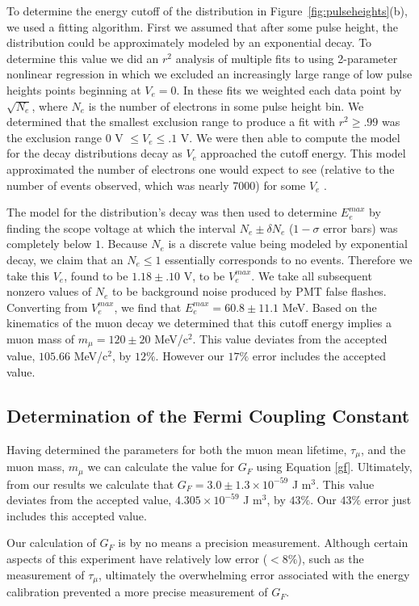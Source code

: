 To determine the energy cutoff of the distribution in Figure~\ref{fig:pulseheights}(b), we
used a fitting algorithm.  First we assumed that after some pulse
height, the distribution could be approximately modeled by an
exponential decay.  To determine this value we did an $r^{2}$ analysis
of multiple fits to using 2-parameter nonlinear regression in which we
excluded an increasingly large range of low pulse heights points
beginning at $V_{e}=0$.  In these fits we weighted each data point by
$\sqrt{N_{e}}$, where $N_{e}$ is the number of electrons in some pulse
height bin.  We determined that the smallest exclusion range to
produce a fit with $r^{2}\geq.99$ was the exclusion range $0$ V $\leq
V_{e}\leq .1$ V.  We were then able to compute the model for the
decay distributions decay as $V_{e}$ approached the cutoff energy.
This model approximated the number of electrons one would expect to
see (relative to the number of events observed, which was nearly 7000)
for some $V_{e}$ .

The model for the distribution's decay was then used to determine
$E_{e}^{max}$ by finding the scope voltage at which the interval
$N_{e}\pm \delta N_{e}$ ($1-\sigma$ error bars) was completely below
$1$.  Because $N_{e}$ is a discrete value being modeled by exponential
decay, we claim that an $N_{e} \leq 1$ essentially corresponds to no
events.  Therefore we take this $V_{e}$, found to be $1.18\pm.10$ V,
to be $V_{e}^{max}$. We take all subsequent nonzero values of $N_{e}$
to be background noise produced by PMT false flashes.  Converting from
$V_{e}^{max}$, we find that $E_{e}^{max}=60.8 \pm 11.1$ MeV.  Based on
the kinematics of the muon decay we determined that this cutoff energy
implies a muon mass of $m_{\mu} = 120 \pm 20$ MeV/c$^{2}$.  This
value deviates from the accepted value, $105.66$ MeV/c$^{2}$, by $12\%$.
However our $17\%$ error includes the accepted value.

\subsection{Determination of the Fermi Coupling Constant}\label{determinationofweakforcecouplingconstant}

Having determined the parameters for both the muon mean lifetime, $\tau_{\mu}$, and the muon mass, $m_{\mu}$ we can calculate the value for $G_{F}$ using Equation \eqref{gf}. Ultimately, from our results we calculate that $G_{F}=3.0\pm1.3\times 10^{-59}$ J m$^{3}$.  This value deviates from the accepted value, $4.305\times10^{-59}$ J m$^{3}$\cite{pdg}, by $43\%$. Our $43\%$ error just includes this accepted value.

Our calculation of $G_F$ is by no means a precision measurement.  Although certain aspects of this experiment have relatively low error ($<8\%$), such as the measurement of $\tau_{\mu}$, ultimately the overwhelming error associated with the energy calibration prevented a more precise measurement of $G_F$.
